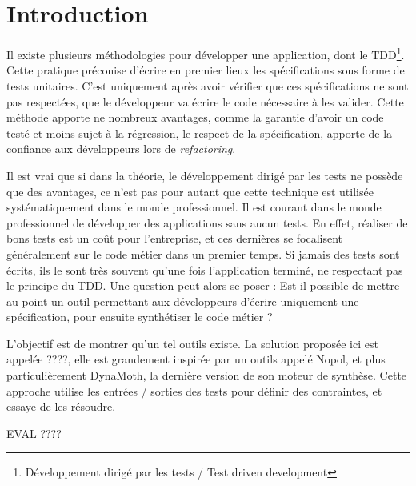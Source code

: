 \chapter*{Introduction}
	\thispagestyle{introduction}


\par Il existe plusieurs méthodologies pour développer une application, dont le TDD\footnote{Développement dirigé par les tests / Test driven development}. Cette pratique préconise d'écrire en premier lieux les spécifications sous forme de tests unitaires. C'est uniquement après avoir vérifier que ces spécifications ne sont pas respectées, que le développeur va écrire le code nécessaire à les valider. Cette méthode apporte ne nombreux avantages, comme la garantie d'avoir un code testé et moins sujet à la régression, le respect de la spécification, apporte de la confiance aux développeurs lors de \textit{refactoring}. 

\par Il est vrai que si dans la théorie, le développement dirigé par les tests ne possède que des avantages, ce n'est pas pour autant que cette technique est utilisée systématiquement dans le monde professionnel. Il est courant dans le monde professionnel de développer des applications sans aucun tests. En effet, réaliser de bons tests est un coût pour l'entreprise, et ces dernières se focalisent généralement sur le code métier dans un premier temps. Si jamais des tests sont écrits, ils le sont très souvent qu'une fois l'application terminé, ne respectant pas le principe du TDD. Une question peut alors se poser : Est-il possible de mettre au point un outil permettant aux développeurs d'écrire uniquement une spécification, pour ensuite synthétiser le code métier ?

\par L'objectif est de montrer qu'un tel outils existe. La solution proposée ici est appelée ????, elle est grandement inspirée par un outils appelé Nopol\cite{nopol}, et plus particulièrement DynaMoth, la dernière version de son moteur de synthèse. Cette approche utilise les entrées / sorties des tests pour définir des contraintes, et essaye de les résoudre.


\par EVAL ????